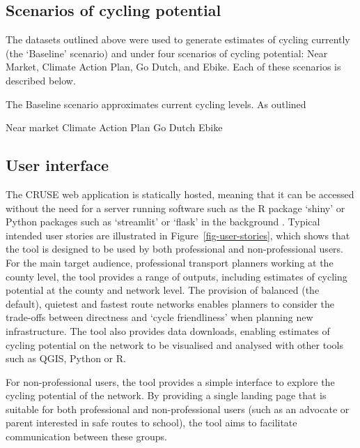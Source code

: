 \documentclass[
  super,
  preprint,
  3p]{elsarticle}
\begin{document}
\hypertarget{sec-scenarios}{%
\subsection{Scenarios of cycling potential}\label{sec-scenarios}}

The datasets outlined above were used to generate estimates of cycling
currently (the `Baseline' scenario) and under four scenarios of cycling
potential: Near Market, Climate Action Plan, Go Dutch, and Ebike. Each
of these scenarios is described below.

The Baseline scenario approximates current cycling levels. As outlined

Near market Climate Action Plan Go Dutch Ebike

\hypertarget{sec-ui}{%
\subsection{User interface}\label{sec-ui}}

The CRUSE web application is statically hosted, meaning that it can be
accessed without the need for a server running software such as the R
package `shiny' or Python packages such as `streamlit' or `flask' in the
background \citep{wickham2021}. Typical intended user stories are
illustrated in Figure~\ref{fig-user-stories}, which shows that the tool
is designed to be used by both professional and non-professional users.
For the main target audience, professional transport planners working at
the county level, the tool provides a range of outputs, including
estimates of cycling potential at the county and network level. The
provision of balanced (the default), quietest and fastest route networks
enables planners to consider the trade-offs between directness and
`cycle friendliness' when planning new infrastructure. The tool also
provides data downloads, enabling estimates of cycling potential on the
network to be visualised and analysed with other tools such as QGIS,
Python or R.

For non-professional users, the tool provides a simple interface to
explore the cycling potential of the network. By providing a single
landing page that is suitable for both professional and non-professional
users (such as an advocate or parent interested in safe routes to
school), the tool aims to facilitate communication between these groups.
\end{document}
